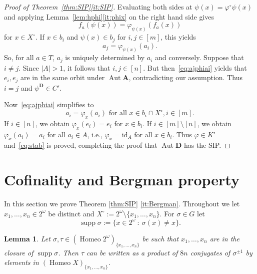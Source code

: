 \documentclass[12pt,a4paper,reqno]{amsart}
\numberwithin{equation}{section}
\theoremstyle{plain}
\newtheorem{lem}[thm]{Lemma}
\theoremstyle{definition}
\newcommand{\A}{\mathbf{A}}
\newcommand{\D}{\mathbf{D}}
\newcommand{\id}{\mathrm{id}}
\DeclareMathOperator{\Aut}{Aut}
\DeclareMathOperator{\Homeo}{Homeo}
\DeclareMathOperator{\supp}{supp}
\newcommand{\st}{\: :\:}
\begin{document}
\begin{proof}[Proof of Theorem~\ref{thm:SIP}\eqref{it:SIP}]
Evaluating both sides at $\psi(x)=\varphi^\circ\psi(x)$ and applying  Lemma~\ref{lem:hphi}\eqref{it:phix}
on the right hand side gives
 \[ f_a(\psi(x)) = \varphi_{\psi(x)}(f_a(x)) \]
 for $x\in X^\circ$.
 If $x\in b_i$ and $\psi(x)\in b_j$ for $i,j\in [m]$, this yields
\begin{equation} \label{eq:ajphiai}
 a_j = \varphi_{\psi(x)}(a_i).
\end{equation}
 So, for all $a\in T$, $a_j$ is uniquely determined by $a_i$ and conversely.
 Suppose that $i\neq j$. Since $|A|>1$, it follows that $i,j\in [n]$.
 But then~\eqref{eq:ajphiai} yields that $e_i,e_j$ are in the same orbit under $\Aut\A$, contradicting our assumption.
 Thus $i=j$ and $\psi^\D\in C'$.

 Now~\eqref{eq:ajphiai} simplifies to 
\[ a_i = \varphi_{x}(a_i) \text{ for all } x\in b_i\cap X^\circ, i \in [m]. \]
 If $i\in [n]$, we obtain $\varphi_x(e_i) = e_i$ for $x\in b_i$.
 If $i\in [m]\setminus [n]$, we obtain $\varphi_x(a_i) = a_i$ for all $a_i\in A$, i.e., $\varphi_x = \id_A$ for all $x\in b_i$.
 Thus $\varphi\in K'$ and~\eqref{eq:stab} is proved, completing the proof that $\Aut\D$ has the SIP.
\end{proof}  


 


\section{Cofinality and Bergman property} \label{sec:Bergman}

In this section we prove Theorem \ref{thm:SIP} \eqref{it:Bergman}.
Throughout we let  $x_1,\dots,x_n\in 2^\omega$ be distinct and $X^\circ:=2^\omega\setminus \{x_1,\dots,x_n\}$. For $\sigma\in G$ let
 \[ \supp\sigma := \{ x\in 2^\omega \st \sigma(x)\neq x \}. \]
 
 
\begin{lem} \label{lem:boundconj}
 Let $\sigma,\tau\in(\Homeo 2^\omega)_{\{x_1,\dots,x_n\}}$ be such that
$x_1,\dots,x_n$ are in the closure of $\supp\sigma$.
Then $\tau$ can be written as a product of $8n$ conjugates of $\sigma^{\pm 1}$
by elements in $(\Homeo X)_{\{x_1,\dots,x_n\}}$.
\end{lem}
\end{document}
